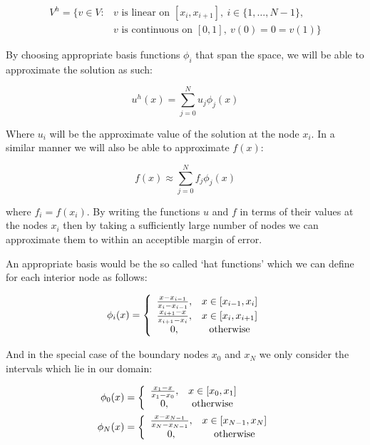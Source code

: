 \begin{align*}
    V^h = \{v \in V: &v \text{ is linear on } [x_i, x_{i+1}],
          \ i \in \{1, \ldots, N - 1\}, \\
          &v \text{ is continuous on } [0, 1],\ v(0) = 0 = v(1)\}
\end{align*}

By choosing appropriate basis functions $\phi_i$ that span the space, we will
be able to approximate the solution as such:

\begin{equation}\label{eq:one-d-approx-soln}
    u^h(x) = \sum_{j = 0}^N{u_j\phi_j(x)}
\end{equation}

Where $u_i$ will be the approximate value of the solution at the node $x_i$. In
a similar manner we will also be able to approximate $f(x)$:

\begin{equation}
    f(x) \approx \sum_{j = 0}^N f_j\phi_j(x)
\end{equation}

where $f_i = f(x_i)$. By writing the functions $u$ and $f$ in terms of their
values at the nodes $x_i$ then by taking a sufficiently large number of nodes
we can approximate them to within an acceptible margin of error.


An appropriate basis would be the so called `hat functions' which we can define
for each interior node as follows:

\begin{equation}\label{eq:one-d-hat-basis}
    \phi_i(x) = \left\{\begin{array}{c c}
                    \frac{x - x_{i-1}}{x_i - x_{i - 1}}, & x \in [x_{i-1}, x_i] \\
                    \frac{x_{i+1} - x}{x_{i + 1} - x_i}, & x \in [x_i, x_{i + 1}] \\
                    0, & \text{otherwise}
                \end{array}\right.
\end{equation}

And in the special case of the boundary nodes $x_0$ and $x_N$ we only consider
the intervals which lie in our domain:

\begin{align}
    \phi_0(x) &= \left\{\begin{array}{c c}
                    \frac{x_1 - x}{x_1 - x_0}, & x \in [x_0, x_1] \\
                    0, & \text{otherwise}
    \end{array}\right.
    \\
    \phi_N(x) &= \left\{\begin{array}{c c}
                    \frac{x - x_{N - 1}}{x_N - x_{N-1}}, & x \in [x_{N-1}, x_N] \\
                    0, & \text{otherwise}
    \end{array}\right.
\end{align}

